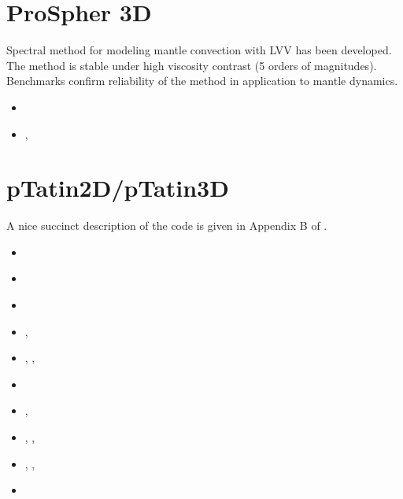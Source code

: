 \section{ProSpher 3D}

Spectral method for modeling mantle convection with LVV has been developed.
The method is stable under high viscosity contrast (5 orders of magnitudes).
Benchmarks confirm reliability of the method in application to mantle dynamics.

\begin{small}
\begin{itemize}
\item[\twothousandthirteen] \textcite{pekr13} 
\item[\twothousandtwenty]   \textcite{peke20}, \textcite{pekk20}
\end{itemize}
\end{small}

\section{pTatin2D/pTatin3D}
A nice succinct description of the code is given in Appendix B of \cite{lemh17}. 
\begin{small}
\begin{itemize}
\item[\twothousandthirteen]   \textcite{phil13}
\item[\twothousandfourteen]   \textcite{mabl14}
\item[\twothousandfifteen]    \textcite{mabl15}
\item[\twothousandseventeen]  \textcite{lemh17},  \textcite{magm17}
\item[\twothousandeighteen]   \textcite{jolp18},  \textcite{lecd18}, \textcite{jolp18b}
\item[\twothousandnineteen]   \textcite{jolm19}
\item[\twothousandtwenty]     \textcite{duhm20},  \textcite{jolm20}
\item[\twothousandtwentyone]  \textcite{jokd21},  \textcite{iola21}, \textcite{pelg21}
\item[\twothousandtwentytwo]  \textcite{lala22},  \textcite{iobr22}, \textcite{wohw22}
\item[\twothousandtwentyfour] \textcite{pelj24}
\end{itemize}
\end{small}


